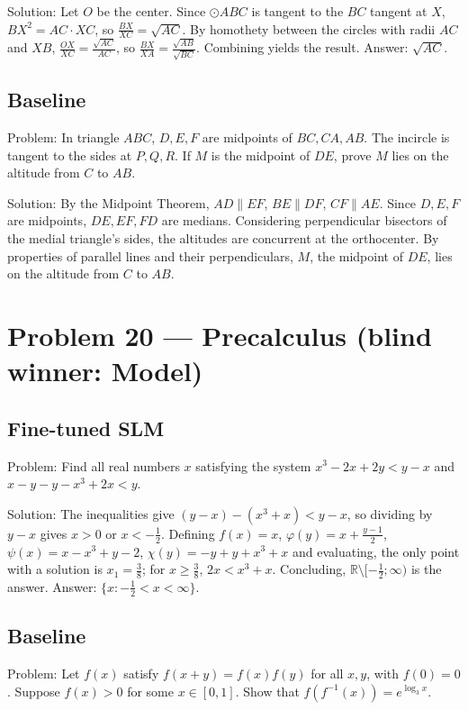 \documentclass[11pt]{article}
\begin{document}
Solution:
Let $O$ be the center. Since $\odot ABC$ is tangent to the $BC$ tangent at $X$, $BX^2 = AC\cdot XC$, so $\frac{BX}{XC}=\sqrt{AC}$. By homothety between the circles with radii $AC$ and $XB$, $\frac{OX}{XC}=\frac{\sqrt{AC}}{AC}$, so $\frac{BX}{XA}=\frac{\sqrt{AB}}{\sqrt{BC}}$. Combining yields the result. Answer: $\sqrt{AC}$.

\subsection*{Baseline}

Problem:
In triangle $ABC$, $D,E,F$ are midpoints of $BC,CA,AB$. The incircle is tangent to the sides at $P,Q,R$. If $M$ is the midpoint of $DE$, prove $M$ lies on the altitude from $C$ to $AB$.

Solution:
By the Midpoint Theorem, $AD \parallel EF$, $BE \parallel DF$, $CF \parallel AE$. Since $D,E,F$ are midpoints, $DE, EF, FD$ are medians. Considering perpendicular bisectors of the medial triangle's sides, the altitudes are concurrent at the orthocenter. By properties of parallel lines and their perpendiculars, $M$, the midpoint of $DE$, lies on the altitude from $C$ to $AB$.

\section*{Problem 20 --- Precalculus \quad(blind winner: Model)}

\subsection*{Fine-tuned SLM}

Problem:
Find all real numbers $x$ satisfying the system $x^{3}-2 x+2 y < y-x$ and $x-y-y-x^{3}+2 x < y$.

Solution:
The inequalities give $(y-x)-(x^3+x)<y-x$, so dividing by $y-x$ gives $x>0$ or $x<-\frac12$. Defining $f(x)=x$, $\varphi(y)=x+\frac{y-1}2$, $\psi(x)=x-x^3+y-2$, $\chi(y)=-y+y+x^3+x$ and evaluating, the only point with a solution is $x_1=\frac38$; for $x\ge\frac38$, $2x<x^3+x$. Concluding, $\mathbb R\setminus[-\frac12;\infty)$ is the answer. Answer: $\{x : -\frac12 < x < \infty\}$.

\subsection*{Baseline}

Problem:
Let $f(x)$ satisfy $f(x + y) = f(x)f(y)$ for all $x,y$, with $f(0) = 0$. Suppose $f(x) > 0$ for some $x \in [0, 1]$. Show that $f(f^{-1}(x)) = e^{\log_3{x}}$.
\end{document}
